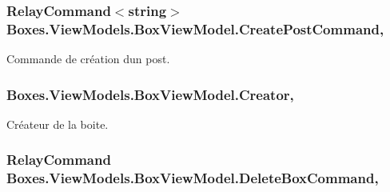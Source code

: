\subsubsection[{\texorpdfstring{Create\+Post\+Command}{CreatePostCommand}}]{\setlength{\rightskip}{0pt plus 5cm}Relay\+Command$<$string$>$ Boxes.\+View\+Models.\+Box\+View\+Model.\+Create\+Post\+Command\hspace{0.3cm}{\ttfamily [get]}, {}}\hypertarget{class_boxes_1_1_view_models_1_1_box_view_model_a4742d289c4d4c9d0e91cfe43e2be39ed}{}\label{class_boxes_1_1_view_models_1_1_box_view_model_a4742d289c4d4c9d0e91cfe43e2be39ed}


Commande de création d\textquotesingle{}un post. 

\subsubsection[{\texorpdfstring{Creator}{Creator}}]{ Boxes.\+View\+Models.\+Box\+View\+Model.\+Creator\hspace{0.3cm}{\ttfamily [get]}, {\ttfamily [set]}}\hypertarget{class_boxes_1_1_view_models_1_1_box_view_model_a99c51cc8242caaf9257c7a4f9b9155b4}{}\label{class_boxes_1_1_view_models_1_1_box_view_model_a99c51cc8242caaf9257c7a4f9b9155b4}


Créateur de la boite. 

\subsubsection[{\texorpdfstring{Delete\+Box\+Command}{DeleteBoxCommand}}]{\setlength{\rightskip}{0pt plus 5cm}Relay\+Command Boxes.\+View\+Models.\+Box\+View\+Model.\+Delete\+Box\+Command\hspace{0.3cm}{\ttfamily [get]}, {}}\hypertarget{class_boxes_1_1_view_models_1_1_box_view_model_a066ae0af03eb9916946d060252f46b0a}{}\label{class_boxes_1_1_view_models_1_1_box_view_model_a066ae0af03eb9916946d060252f46b0a}


